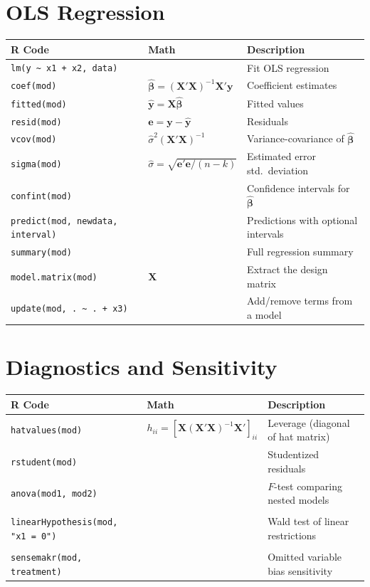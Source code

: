 \documentclass[11pt]{article}
\begin{document}
\section*{OLS Regression}

\begin{tabular}{@{}lll@{}}
\toprule
\textbf{R Code} & \textbf{Math} & \textbf{Description} \\
\midrule
\texttt{lm(y \~{} x1 + x2, data)} & & Fit OLS regression \\
\texttt{coef(mod)} & $\hat{\bm{\beta}} = (\bm{X}'\bm{X})^{-1}\bm{X}'\bm{y}$ & Coefficient estimates \\
\texttt{fitted(mod)} & $\hat{\bm{y}} = \bm{X}\hat{\bm{\beta}}$ & Fitted values \\
\texttt{resid(mod)} & $\bm{e} = \bm{y} - \hat{\bm{y}}$ & Residuals \\
\texttt{vcov(mod)} & $\hat{\sigma}^2(\bm{X}'\bm{X})^{-1}$ & Variance-covariance of $\hat{\bm{\beta}}$ \\
\texttt{sigma(mod)} & $\hat{\sigma} = \sqrt{\bm{e}'\bm{e}/(n-k)}$ & Estimated error std.\ deviation \\
\texttt{confint(mod)} & & Confidence intervals for $\hat{\bm{\beta}}$ \\
\texttt{predict(mod, newdata, interval)} & & Predictions with optional intervals \\
\texttt{summary(mod)} & & Full regression summary \\
\texttt{model.matrix(mod)} & $\bm{X}$ & Extract the design matrix \\
\texttt{update(mod, . \~{} . + x3)} & & Add/remove terms from a model \\
\bottomrule
\end{tabular}

\section*{Diagnostics and Sensitivity}

\begin{tabular}{@{}lll@{}}
\toprule
\textbf{R Code} & \textbf{Math} & \textbf{Description} \\
\midrule
\texttt{hatvalues(mod)} & $h_{ii} = [\bm{X}(\bm{X}'\bm{X})^{-1}\bm{X}']_{ii}$ & Leverage (diagonal of hat matrix) \\
\texttt{rstudent(mod)} & & Studentized residuals \\
\texttt{anova(mod1, mod2)} & & $F$-test comparing nested models \\
\addlinespace
\multicolumn{3}{@{}l}{\textit{From} \texttt{car}\textit{:}} \\
\texttt{linearHypothesis(mod, "x1 = 0")} & & Wald test of linear restrictions \\
\addlinespace
\multicolumn{3}{@{}l}{\textit{From} \texttt{sensemakr}\textit{:}} \\
\texttt{sensemakr(mod, treatment)} & & Omitted variable bias sensitivity \\
\bottomrule
\end{tabular}
\end{document}
